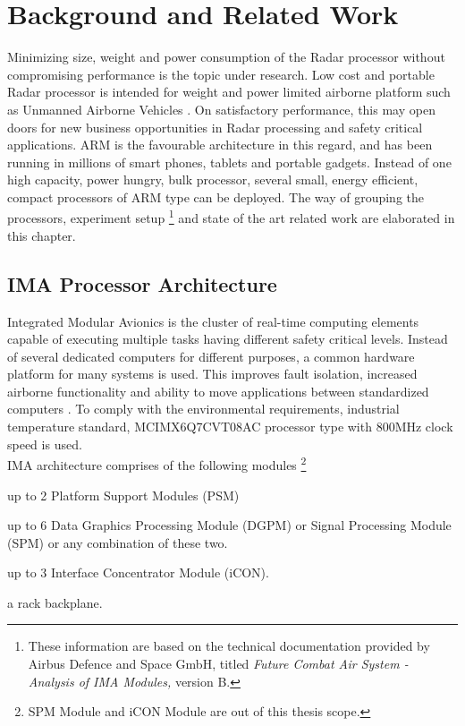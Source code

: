 \chapter{Background and Related Work}
\label{chap:bg_related_work}
Minimizing size, weight and power consumption of the Radar processor without compromising performance is the topic under research. Low cost and portable Radar processor is intended for weight and power limited airborne platform such as Unmanned Airborne Vehicles \cite{uav}. On satisfactory performance, this may open doors for new business opportunities in Radar processing and safety critical applications. ARM is the favourable architecture in this regard, and has been running in millions of smart phones, tablets and portable gadgets. Instead of one high capacity, power hungry, bulk processor, several small, energy efficient, compact processors of ARM type can be deployed. The way of grouping the processors, experiment setup \footnote{These information are based on the technical documentation provided by Airbus Defence and Space GmbH, titled \textsl{Future Combat Air System - Analysis of IMA Modules,} version B.} and state of the art related work are elaborated in this chapter.

\section{IMA Processor Architecture} 
\label{sec:bg_related_work:ima}
Integrated Modular Avionics is the cluster of real-time computing elements capable of executing multiple tasks having different safety critical levels. Instead of several dedicated computers for different purposes, a common hardware platform for many systems is used. This improves fault isolation, increased airborne functionality and ability to move applications between standardized computers \cite{theAvionics}. To comply with the environmental requirements, industrial temperature standard, MCIMX6Q7CVT08AC processor type with 800MHz clock speed is used. \\

IMA architecture comprises of the following modules \footnote{SPM Module and iCON Module are out of this thesis scope.}
\begin{compactitem} 
	\item up to 2 Platform Support Modules (PSM) 
	\item up to 6 Data Graphics Processing Module (DGPM) or Signal Processing Module (SPM) or any combination of these two.
	\item up to 3 Interface Concentrator Module (iCON).
	\item a rack backplane.
\end{compactitem}

